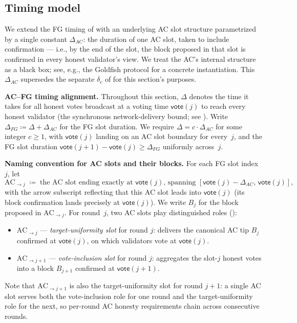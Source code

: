 \documentclass{article}
\newcommand{\vote}{\mathsf{vote}}
\renewcommand{\paragraph}[1]{\vspace{7pt}\noindent\textbf{#1}}
\theoremstyle{plain}
\theoremstyle{definition}
\theoremstyle{remark}
\begin{document}
\subsection{Timing model}\label{rev:subsec:per-round-timing}

We extend the FG timing of  with an underlying AC slot structure parametrized by a single constant $\Delta_{AC}$: the duration of one AC slot, taken to include confirmation --- i.e., by the end of the slot, the block proposed in that slot is confirmed in every honest validator's view. We treat the AC's internal structure as a black box; see, e.g., the Goldfish protocol for a concrete instantiation. This $\Delta_{AC}$ supersedes the separate $\delta_c$ of  for this section's purposes.

\paragraph{AC--FG timing alignment.}
Throughout this section, $\Delta$ denotes the time it takes for all honest votes broadcast at a voting time $\vote(j)$ to reach every honest validator (the synchronous network-delivery bound; see ). Write $\Delta_{FG} \coloneqq \Delta + \Delta_{AC}$ for the FG slot duration. We require $\Delta = c \cdot \Delta_{AC}$ for some integer $c \geq 1$, with $\vote(j)$ landing on an AC slot boundary for every~$j$, and the FG slot duration $\vote(j+1) - \vote(j) \geq \Delta_{FG}$ uniformly across~$j$.

\paragraph{Naming convention for AC slots and their blocks.}
For each FG slot index $j$, let
\[
  \mathrm{AC}_{\to j} \;\coloneqq\; \text{the AC slot ending exactly at $\vote(j)$, spanning $[\vote(j) - \Delta_{AC},\, \vote(j)]$,}
\]
with the arrow subscript reflecting that this AC slot leads into $\vote(j)$ (its block confirmation lands precisely at $\vote(j)$). We write $B_j$ for the block proposed in $\mathrm{AC}_{\to j}$. For round~$j$, two AC slots play distinguished roles ():
\begin{itemize}
  \item $\mathrm{AC}_{\to j}$ --- \emph{target-uniformity slot} for round $j$: delivers the canonical AC tip $B_j$ confirmed at $\vote(j)$, on which validators vote at $\vote(j)$.
  \item $\mathrm{AC}_{\to j+1}$ --- \emph{vote-inclusion slot} for round $j$: aggregates the slot-$j$ honest votes into a block $B_{j+1}$ confirmed at $\vote(j+1)$.
\end{itemize}
Note that $\mathrm{AC}_{\to j+1}$ is also the target-uniformity slot for round $j+1$: a single AC slot serves both the vote-inclusion role for one round and the target-uniformity role for the next, so per-round AC honesty requirements chain across consecutive rounds.
\end{document}
